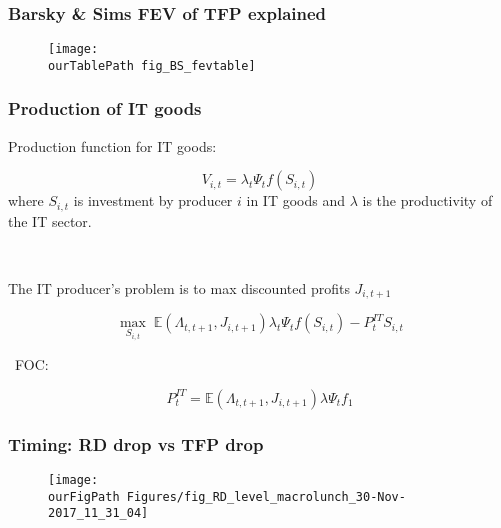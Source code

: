 \documentclass{beamer}
\def \ourFigPath {../../}
\def \ourTablePath {../../Tables/}
\begin{document}
\begin{frame}
	\frametitle{Barsky \& Sims FEV of TFP explained}
	\label{BS_FEV}
	

\vspace{-1cm}
\noindent
\begin{figure}
\centering
\texttt{[image: \\ourTablePath fig\_BS\_fevtable]}
\end{figure}
	
\hyperlink{related_lit}{}	
\end{frame}

\begin{frame}
	\frametitle{Production of IT goods}
	\label{it_sector}
	
Production function for IT goods:

\begin{equation}
V_{i,t} = \lambda_t \Psi_t f(S_{i,t}) 
\end{equation}
where $S_{i,t}$ is investment by producer $i$ in IT goods and $\lambda$ is the productivity of the IT sector. 

\

The IT producer's problem is to max discounted profits $J_{i,t+1}$

\begin{equation}
\max_{S_{i,t}} \; \mathbb{E}(\Lambda_{t,t+1},J_{i,t+1})\lambda_t \Psi_t f(S_{i,t}) - P^{IT}_t S_{i,t}
\end{equation}

\
FOC: 

\begin{equation}
P^{IT}_t = \mathbb{E}(\Lambda_{t,t+1},J_{i,t+1})\lambda \Psi_t f_1
\end{equation}
	
\hyperlink{expanding_variety}{}	
\end{frame}


\begin{frame}
	\frametitle{Timing: RD drop vs TFP drop}
	\label{timing}
	
	\vspace{-1cm}
	\noindent
	\begin{figure}
		\centering
		\texttt{[image: \\ourFigPath Figures/fig\_RD\_level\_macrolunch\_30-Nov-2017\_11\_31\_04]}
	\end{figure}

	
\hyperlink{convincing}{}	
\end{frame}
\end{document}
